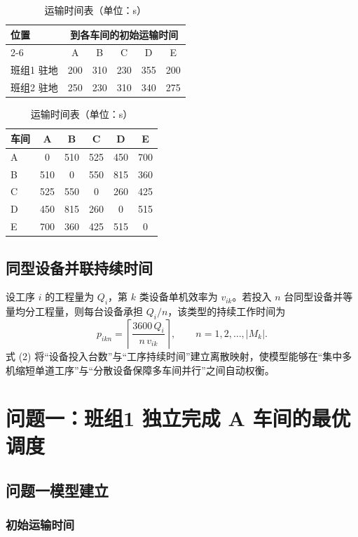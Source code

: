 \documentclass[12pt,a4paper]{article}
\begin{document}
\begin{table}[H]
\centering
\caption{运输时间表（单位：s）}
\small
\begin{tabular}{@{}lccccc@{}}
\toprule
\multirow{2}{*}{位置} & \multicolumn{5}{c}{到各车间的初始运输时间} \\
\cmidrule(lr){2-6}
 & A & B & C & D & E \\
\midrule
班组1 驻地 & 200 & 310 & 230 & 355 & 200 \\
班组2 驻地 & 250 & 230 & 310 & 340 & 275 \\
\bottomrule
\end{tabular}

\medskip
\begin{tabular}{@{}lccccc@{}}
\toprule
车间 & A & B & C & D & E \\
\midrule
A & 0 & 510 & 525 & 450 & 700 \\
B & 510 & 0 & 550 & 815 & 360 \\
C & 525 & 550 & 0 & 260 & 425 \\
D & 450 & 815 & 260 & 0 & 515 \\
E & 700 & 360 & 425 & 515 & 0 \\
\bottomrule
\end{tabular}
\end{table}

\subsection{同型设备并联持续时间}

设工序 $i$ 的工程量为 $Q_i$，第 $k$ 类设备单机效率为 $v_{ik}$。若投入 $n$ 台同型设备并等量均分工程量，则每台设备承担 $Q_i/n$，该类型的持续工作时间为
\begin{equation}
p_{ikn}=\left\lceil\frac{3600\,Q_i}{n\,v_{ik}}\right\rceil,\qquad n=1,2,\dots,|M_k|.
\end{equation}
式 (2) 将“设备投入台数”与“工序持续时间”建立离散映射，使模型能够在“集中多机缩短单道工序”与“分散设备保障多车间并行”之间自动权衡。

\section{问题一：班组1 独立完成 A 车间的最优调度}

\subsection{问题一模型建立}

\subsubsection{初始运输时间}
\end{document}
